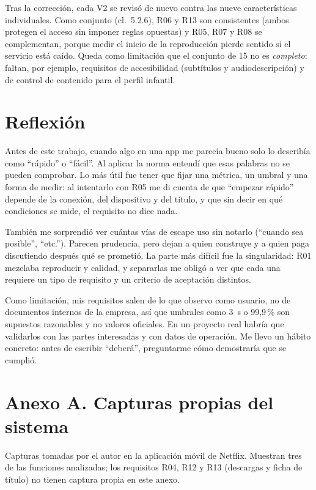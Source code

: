 \documentclass[11pt,a4paper]{article}
\newcommand{\cl}[1]{cl.~#1}
\begin{document}
Tras la correcci\'on, cada V2 se revis\'o de nuevo contra las nueve caracter\'isticas individuales. Como conjunto (\cl{5.2.6}), R06 y R13 son consistentes (ambos protegen el acceso sin imponer reglas opuestas) y R05, R07 y R08 se complementan, porque medir el inicio de la reproducci\'on pierde sentido si el servicio est\'a ca\'ido. Queda como limitaci\'on que el conjunto de 15 no es \emph{completo}: faltan, por ejemplo, requisitos de accesibilidad (subt\'itulos y audiodescripci\'on) y de control de contenido para el perfil infantil.

\section{Reflexi\'on}
Antes de este trabajo, cuando algo en una app me parec\'ia bueno solo lo describ\'ia como ``r\'apido'' o ``f\'acil''. Al aplicar la norma entend\'i que esas palabras no se pueden comprobar. Lo m\'as \'util fue tener que fijar una m\'etrica, un umbral y una forma de medir: al intentarlo con R05 me di cuenta de que ``empezar r\'apido'' depende de la conexi\'on, del dispositivo y del t\'itulo, y que sin decir en qu\'e condiciones se mide, el requisito no dice nada.

Tambi\'en me sorprendi\'o ver cu\'antas v\'ias de escape uso sin notarlo (``cuando sea posible'', ``etc.''). Parecen prudencia, pero dejan a quien construye y a quien paga discutiendo despu\'es qu\'e se prometi\'o. La parte m\'as dif\'icil fue la singularidad: R01 mezclaba reproducir y calidad, y separarlas me oblig\'o a ver que cada una requiere un tipo de requisito y un criterio de aceptaci\'on distintos.

Como limitaci\'on, mis requisitos salen de lo que observo como usuario, no de documentos internos de la empresa, as\'i que umbrales como 3~s o 99,9\,\% son supuestos razonables y no valores oficiales. En un proyecto real habr\'ia que validarlos con las partes interesadas y con datos de operaci\'on. Me llevo un h\'abito concreto: antes de escribir ``deber\'a'', preguntarme c\'omo demostrar\'ia que se cumpli\'o.

\appendix
\section*{Anexo A. Capturas propias del sistema}
Capturas tomadas por el autor en la aplicaci\'on m\'ovil de Netflix. Muestran tres de las funciones analizadas; los requisitos R04, R12 y R13 (descargas y ficha de t\'itulo) no tienen captura propia en este anexo.
\end{document}
